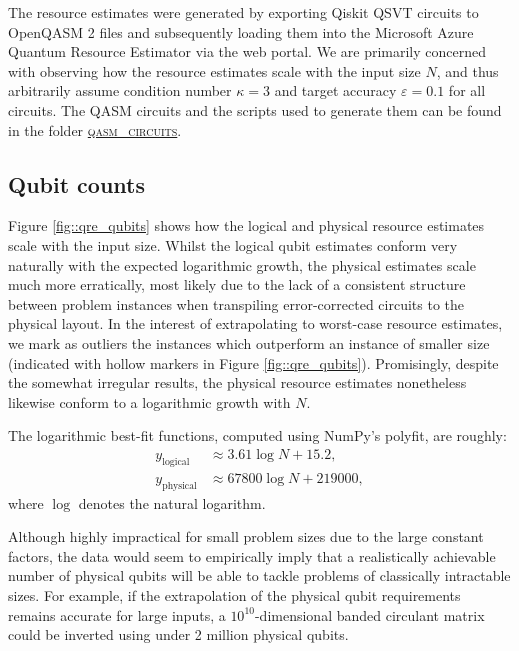 \documentclass[10pt, twocolumn]{article}
\begin{document}
The resource estimates were generated by exporting Qiskit QSVT circuits to OpenQASM 2 files and subsequently loading them into the Microsoft Azure Quantum Resource Estimator via the web portal. We are primarily concerned with observing how the resource estimates scale with the input size $N$, and thus arbitrarily assume condition number $\kappa=3$ and target accuracy $\varepsilon=0.1$ for all circuits. The QASM circuits and the scripts used to generate them can be found in the folder \href{https://github.com/Walden-Killick/QCE24-QRE-Challenge/tree/main/qasm_circuits}{\textsc{qasm\_circuits}}.

\subsection{Qubit counts}

Figure \ref{fig::qre_qubits} shows how the logical and physical resource estimates scale with the input size. Whilst the logical qubit estimates conform very naturally with the expected logarithmic growth, the physical estimates scale much more erratically, most likely due to the lack of a consistent structure between problem instances when transpiling error-corrected circuits to the physical layout. In the interest of extrapolating to worst-case resource estimates, we mark as outliers the instances which outperform an instance of smaller size (indicated with hollow markers in Figure \ref{fig::qre_qubits}). Promisingly, despite the somewhat irregular results, the physical resource estimates nonetheless likewise conform to a logarithmic growth with $N$.

The logarithmic best-fit functions, computed using NumPy's polyfit, are roughly:
\begin{align*}
	y_\text{logical} &\approx 3.61 \log{N} + 15.2, \\
	y_\text{physical} &\approx 67800 \log{N} + 219000,
\end{align*}
where $\log$ denotes the natural logarithm.

Although highly impractical for small problem sizes due to the large constant factors, the data would seem to empirically imply that a realistically achievable number of physical qubits will be able to tackle problems of classically intractable sizes. For example, if the extrapolation of the physical qubit requirements remains accurate for large inputs, a $10^{10}$-dimensional banded circulant matrix could be inverted using under 2 million physical qubits.
\end{document}

